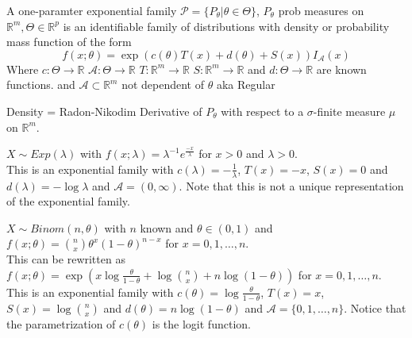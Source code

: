 \documentclass[answers,12pt,addpoints]{exam}
\begin{document}
\begin{definition}
     A one-paramter exponential family $\mathcal{P} = \{P_\theta | \theta \in \Theta\}$, $P_\theta$ prob measures on $\mathbb{R}^m, \Theta \in \mathbb{R}^p$ is an identifiable family of distributions with density or probability mass function of the form 
    $$ f(x; \theta) = \exp\left( c(\theta)T(x) + d(\theta) + S(x) \right) I_{\mathcal{A}}(x)$$
    Where $c: \Theta \to \mathbb{R}$ $\mathcal{A}: \Theta \to \mathbb{R}$ $T: \mathbb{R}^m \to \mathbb{R}$ $S: \mathbb{R}^m \to \mathbb{R}$ and $d: \Theta \to \mathbb{R}$ are known functions. and $\mathcal{A} \subset \mathbb{R}^m$ not dependent of $\theta$ aka Regular
\end{definition}
\begin{remark}
    Density = Radon-Nikodim Derivative of $P_\theta$ with respect to a $\sigma$-finite measure $\mu$ on $\mathbb{R}^m$.
\end{remark}
\begin{example}
    $X \sim Exp(\lambda)$ with $f(x;\lambda) = \lambda^{-1} e^{\frac{-x}{\lambda}}$ for $x > 0$ and $\lambda > 0$.\\
    This is an exponential family with $c(\lambda) = -\frac{1}{\lambda}$, $T(x) = -x$, $S(x) = 0$ and $d(\lambda) = -\log \lambda$ and $\mathcal{A} = (0,\infty)$.
    Note that this is not a unique representation of the exponential family. 
\end{example}
\begin{example}
    $X \sim Binom(n,\theta)$ with $n$ known and $\theta \in (0,1)$ and $f(x;\theta) = \binom{n}{x} \theta^x (1-\theta)^{n-x}$ for $x = 0,1,\ldots,n$.\\
    This can be rewritten as $f(x;\theta) = \exp\left( x\log \frac{\theta}{1-\theta} + \log \binom{n}{x} + n\log(1-\theta) \right)$ for $x = 0,1,\ldots,n$.\\
    This is an exponential family with $c(\theta) = \log \frac{\theta}{1-\theta}$, $T(x) = x$, $S(x) = \log \binom{n}{x}$ and $d(\theta) = n\log(1-\theta)$ and $\mathcal{A} = \{0,1,\ldots,n\}$.
    Notice that the parametrization of $c(\theta)$ is the logit function. 
\end{example}
\end{document}
